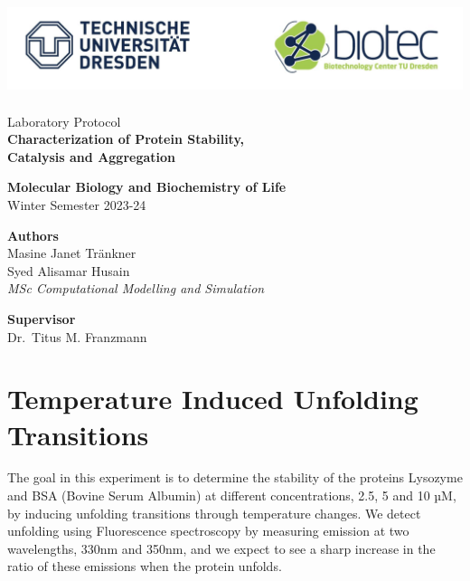 \documentclass[a4paper,11pt]{article}
\begin{document}
    \begin{titlepage}
        \begin{center}
            \includegraphics[height=7.5em]{../resources/unilogo.png}
            \vspace{5em}

            {\Large Laboratory Protocol} \\ 
            {\LARGE\bfseries Characterization of Protein Stability,\\ Catalysis and Aggregation}
            \vspace{3em}
            
            {\bfseries Molecular Biology and Biochemistry of Life}\\
            Winter Semester 2023-24
            \vspace{15em}

            {\bfseries Authors} \\ 
            Masine Janet Tränkner\\
            Syed Alisamar Husain\\
            {\it MSc Computational Modelling and Simulation}
            \vspace{5em}

            {\bfseries Supervisor} \\ Dr.\ Titus M. Franzmann
        \end{center}
        
    \end{titlepage}
    \pagebreak

    \tableofcontents
    \listoffigures
    \pagebreak

    \section{Temperature Induced Unfolding Transitions}
        The goal in this experiment is to determine the stability of the proteins Lysozyme and BSA 
        (Bovine Serum Albumin) at different concentrations, 2.5, 5 and 10 µM, by inducing unfolding 
        transitions through temperature changes.
        We detect unfolding using Fluorescence spectroscopy by measuring emission at 
        two wavelengths, 330nm and 350nm, and we expect to see a sharp increase in the ratio
        of these emissions when the protein unfolds.
\end{document}
